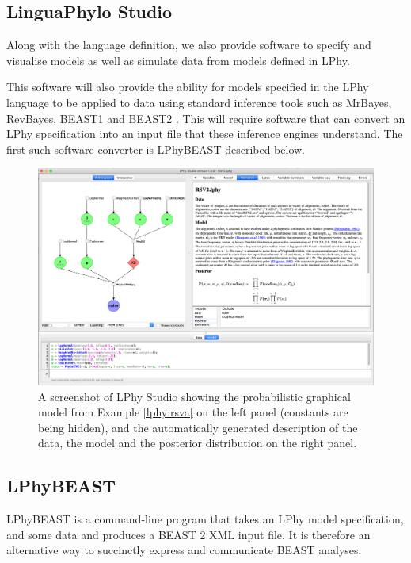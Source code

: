 \documentclass[10pt,letterpaper,table]{article}
\begin{document}
{\subsection*{LinguaPhylo Studio}

Along with the language definition, we also provide software to
specify and visualise models as well as simulate data from models
defined in LPhy.

This software will also provide the ability for models specified in
the LPhy language to be applied to data using standard inference tools
such as MrBayes, RevBayes, BEAST1 and BEAST2
\cite{bouckaert2014beastanalysis,DrummondBouckaert2015,bouckaert2019beastanalysis}.
This will require software that can convert an LPhy specification into
an input file that these inference engines understand.
The first such software converter is LPhyBEAST described below.

\begin{figure}
  \includegraphics[width=\textwidth]{lphystudio_screenshot.png}
  \caption{A screenshot of LPhy Studio showing the probabilistic
    graphical model from Example \ref{lphy:rsva} on the left panel
    (constants are being hidden), and the automatically generated
    description of the data, the model and the posterior
    distribution on the right panel.} 
  \label{fig:lphystudio}
\end{figure}

\subsection*{LPhyBEAST}

LPhyBEAST is a command-line program that takes an LPhy model
specification, and some data and produces a BEAST 2 XML input file.
It is therefore an alternative way to succinctly express and
communicate BEAST analyses.

}
\end{document}
